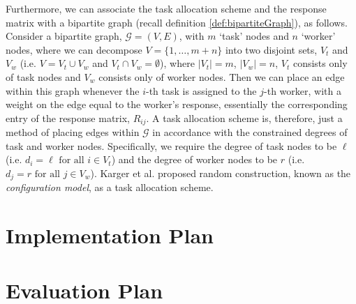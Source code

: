 \documentclass[12pt]{article}
\numberwithin{equation}{section}
\begin{document}
Furthermore, we can associate the task allocation scheme and the response matrix with a bipartite graph (recall definition \ref{def:bipartiteGraph}), as follows. Consider a bipartite graph, $\mathcal{G} = (V,E)$, with $m$ `task' nodes and $n$ `worker' nodes, where we can decompose $V=\{1,\dots,m+n\}$ into two disjoint sets, $V_{t}$ and $V_{w}$ (i.e. $V = V_{t} \cup V_{w}$ and $V_{t} \cap V_{w} = \emptyset$), where $\left\vert{V_{t}}\right\vert = m$, $\left\vert{V_{w}}\right\vert = n$, $V_{t}$ consists only of task nodes and $V_{w}$ consists only of worker nodes. Then we can place an edge within this graph whenever the $i$-th task is assigned to the $j$-th worker, with a weight on the edge equal to the worker's response, essentially the corresponding entry of the response matrix, $R_{ij}$. A task allocation scheme is, therefore, just a method of placing edges within $\mathcal{G}$ in accordance with the constrained degrees of task and worker nodes. Specifically, we require the degree of task nodes to be $\ell$ (i.e. $d_{i} = \ell \text{ for all } i \in V_{t}$) and the degree of worker nodes to be $r$ (i.e. $d_{j} = r \text{ for all } j \in V_{w}$). Karger et al. \cite{KOS13} proposed random construction, known as the \textsl{configuration model}, as a task allocation scheme.


\newpage
\thispagestyle{plain}
\mbox{}
\section {Implementation Plan}
\label{sec:implementationPlan}


\newpage
\thispagestyle{plain}
\mbox{}
\section {Evaluation Plan}
\label{sec:evaluationPlan}


\newpage
\thispagestyle{plain}
\mbox{}



\end{document}
